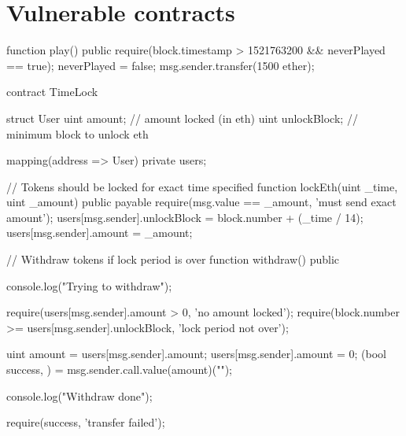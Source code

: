 \section{Vulnerable contracts}

\begin{solidity}[caption=NCC Group - Time manipulation \cite{DASP2018}]
    function play() public {
        require(block.timestamp > 1521763200 && neverPlayed == true);
        neverPlayed = false;
        msg.sender.transfer(1500 ether);
    }
\end{solidity}

\begin{solidity}[caption=SWC116 \cite{swc116}]
contract TimeLock {
    struct User {
        uint amount; // amount locked (in eth)
        uint unlockBlock; // minimum block to unlock eth
    }

    mapping(address => User) private users;

    // Tokens should be locked for exact time specified
    function lockEth(uint _time, uint _amount) public payable {
        require(msg.value == _amount, 'must send exact amount');
        users[msg.sender].unlockBlock = block.number + (_time / 14);
        users[msg.sender].amount = _amount;
    }

    // Withdraw tokens if lock period is over
    function withdraw() public {
        console.log("Trying to withdraw");

        require(users[msg.sender].amount > 0, 'no amount locked');
        require(block.number >= users[msg.sender].unlockBlock, 'lock period not over');

        uint amount = users[msg.sender].amount;
        users[msg.sender].amount = 0;
        (bool success, ) = msg.sender.call.value(amount)("");

        console.log("Withdraw done");

        require(success, 'transfer failed');
    }
}
\end{solidity}


%     
%     
